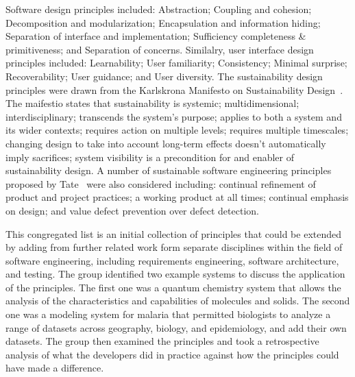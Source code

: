 Software design principles included: Abstraction; Coupling and cohesion; Decomposition and modularization; Encapsulation and information hiding; Separation of interface and implementation; Sufficiency completeness \& primitiveness; and Separation of concerns. Similalry, user interface design principles included: Learnability; User familiarity; Consistency; Minimal surprise; Recoverability; User guidance; and User diversity. The sustainability design principles were drawn from the Karlskrona Manifesto on Sustainability Design~\cite{Becker:2014}. The maifestio states that sustainability is systemic; multidimensional; interdisciplinary; transcends the system's purpose; applies to both a system and its wider contexts; requires action on multiple levels; requires multiple timescales; changing design to take into account long-term effects doesn't automatically imply sacrifices; system visibility is a precondition for and enabler of sustainability design.
A number of sustainable software engineering principles proposed by Tate~\cite{tate2005} were also considered including: continual refinement of product and project practices; a working product at all times; continual emphasis on design; and value defect prevention over defect detection.

This congregated list is an initial collection of principles that could be extended by adding from further related work form separate disciplines within the field of software engineering, including requirements engineering, software architecture, and testing. The group identified two example systems to discuss the application of the principles. The first one was a quantum chemistry system that allows the analysis of the characteristics and capabilities of molecules and solids. The second one was a modeling system for malaria that permitted biologists to analyze a range of datasets across geography, biology, and epidemiology, and add their own datasets. The group then examined the principles and took a retrospective analysis of what the developers did in practice against how the principles could have made a difference.

